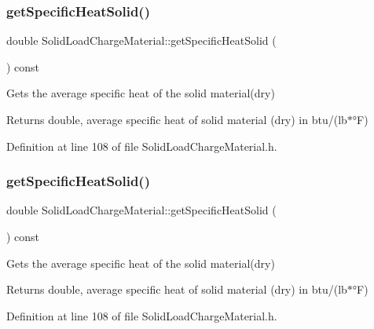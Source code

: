 \subsubsection{\texorpdfstring{get\+Specific\+Heat\+Solid()}{getSpecificHeatSolid()}\hspace{0.1cm}{\footnotesize\ttfamily [2/3]}}
{\footnotesize\ttfamily double Solid\+Load\+Charge\+Material\+::get\+Specific\+Heat\+Solid (\begin{DoxyParamCaption}{ }\end{DoxyParamCaption}) const\hspace{0.3cm}{\ttfamily [inline]}}

Gets the average specific heat of the solid material(dry) \begin{DoxyReturn}{Returns}
double, average specific heat of solid material (dry) in btu/(lb$\ast$°F) 
\end{DoxyReturn}


Definition at line 108 of file Solid\+Load\+Charge\+Material.\+h.

\mbox{\label{class_solid_load_charge_material_af84f1f7dd167f67c0c02206339bbfe27}} 
\subsubsection{\texorpdfstring{get\+Specific\+Heat\+Solid()}{getSpecificHeatSolid()}\hspace{0.1cm}{\footnotesize\ttfamily [3/3]}}
{\footnotesize\ttfamily double Solid\+Load\+Charge\+Material\+::get\+Specific\+Heat\+Solid (\begin{DoxyParamCaption}{ }\end{DoxyParamCaption}) const\hspace{0.3cm}{\ttfamily [inline]}}

Gets the average specific heat of the solid material(dry) \begin{DoxyReturn}{Returns}
double, average specific heat of solid material (dry) in btu/(lb$\ast$°F) 
\end{DoxyReturn}


Definition at line 108 of file Solid\+Load\+Charge\+Material.\+h.

\mbox{\label{class_solid_load_charge_material_ade525be6bb8cb86405daeb61d45311f9}} 
